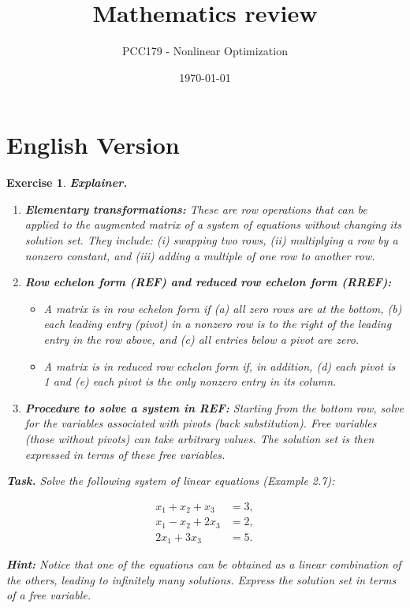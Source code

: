 \documentclass[12pt,a4paper]{article}
\newtheorem{exercise}{Exercise}[section]
\begin{document}
\title{Mathematics review}
\author{PCC179 - Nonlinear Optimization}
\date{\today}
\maketitle


\section{English Version}

\begin{exercise}
\textbf{Explainer.} 

\begin{enumerate}
  \item \textbf{Elementary transformations:} These are row operations that can be applied to the augmented matrix of a system of equations without changing its solution set. They include: (i) swapping two rows, (ii) multiplying a row by a nonzero constant, and (iii) adding a multiple of one row to another row.

  \item \textbf{Row echelon form (REF) and reduced row echelon form (RREF):}
  \begin{itemize}
    \item A matrix is in \emph{row echelon form} if (a) all zero rows are at the bottom, (b) each leading entry (pivot) in a nonzero row is to the right of the leading entry in the row above, and (c) all entries below a pivot are zero.
    \item A matrix is in \emph{reduced row echelon form} if, in addition, (d) each pivot is 1 and (e) each pivot is the only nonzero entry in its column.
  \end{itemize}

  \item \textbf{Procedure to solve a system in REF:} Starting from the bottom row, solve for the variables associated with pivots (back substitution). Free variables (those without pivots) can take arbitrary values. The solution set is then expressed in terms of these free variables.
\end{enumerate}

\bigskip

\textbf{Task.} Solve the following system of linear equations (Example 2.7):

\[
\begin{aligned}
x_1 + x_2 + x_3 &= 3, \\
x_1 - x_2 + 2x_3 &= 2, \\
2x_1 + 3x_3 &= 5.
\end{aligned}
\]

\textbf{Hint:} Notice that one of the equations can be obtained as a linear combination of the others, leading to infinitely many solutions. Express the solution set in terms of a free variable.
\end{exercise}
\end{document}
